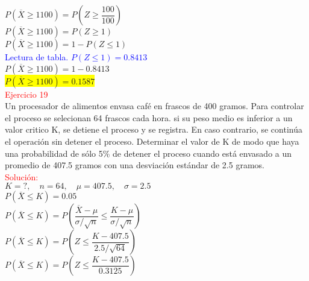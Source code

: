 \documentclass[DIV=calc,paper=a4,fontsize=11pt,openany]{book}
\begin{document}
$\textit{P}(\overline{X} \geqslant 1100) = \textit{P}(\textit{Z} \geqslant \dfrac{100}{100})$\\

$\textit{P}(\overline{X} \geqslant 1100) = \textit{P}(\textit{Z} \geqslant 1)$\\

$\textit{P}(\overline{X} \geqslant 1100) = 1 - \textit{P}(\textit{Z} \leqslant 1)$\\

\textcolor{blue}{Lectura de tabla. $\textit{P}(\textit{Z} \leqslant 1) = 0.8413$}\\

$\textit{P}(\overline{X} \geqslant 1100) = 1 - 0.8413$\\

\colorbox{yellow}{$\textit{P}(\overline{X} \geqslant 1100) = 0.1587$}\\


\textcolor{red}{Ejercicio 19}\\

Un procesador de alimentos envasa café en frascos de 400 gramos. Para controlar el proceso se selecionan 64 frascos cada hora. si su peso medio es inferior a un valor critico K, se detiene el proceso y se registra. En caso contrario, se continúa el operación sin detener el proceso. Determinar el valor de K de modo que haya una probabilidad de sólo 5\% de detener el proceso cuando está envasado a un promedio de 407.5 gramos con una desviación estándar de 2.5 gramos.\\


\textcolor{red}{Solución:}\\

$K = ?, \quad \textit{n} = 64, \quad \mu = 407.5, \quad \sigma = 2.5 $\\

$\textit{P}(\overline{X} \leqslant \textit{K}) = 0.05$\\

$\textit{P}(\overline{X} \leqslant \textit{K}) = \textit{P}(\dfrac{\overline{X} - \mu}{\sigma/\sqrt{\textit{n}}
} \leqslant \dfrac{K - \mu}{\sigma/\sqrt{\textit{n}}})$\\

$\textit{P}(\overline{X} \leqslant \textit{K}) = \textit{P}(Z \leqslant \dfrac{K - 407.5}{2.5/\sqrt{\textit{64}}})$\\

$\textit{P}(\overline{X} \leqslant \textit{K}) = \textit{P}(Z \leqslant \dfrac{K - 407.5}{0.3125})$\\
\end{document}
